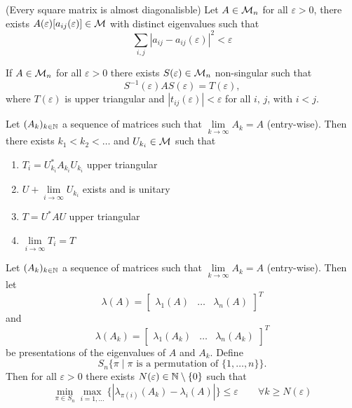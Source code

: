\documentclass[aspectratio=169]{beamer}
\begin{document}
\begin{frame}
\begin{theorem}(Every square matrix is almost diagonalisble)
Let $A\in \mathcal{M}_n$ for all $\varepsilon>0$, there exists $A(\varepsilon)[a_{ij}(\varepsilon)]\in \mathcal{M}$ with distinct eigenvalues such that 
\[\sum\limits_{i,j} | a_{ij}- a_{ij}(\varepsilon)|^2< \varepsilon\]
\end{theorem}
\vfill
\begin{theorem}
If $A\in \mathcal{M}_n$ for all $\varepsilon>0$ there exists $S(\varepsilon)\in \mathcal{M}_n$ non-singular such that 
\[S^{-1}(\varepsilon)AS(\varepsilon)=T(\varepsilon),\]
where $T(\varepsilon)$ is upper triangular and $| t_{ij}(\varepsilon)| <\varepsilon$ for all $i,\, j$, with $i<j$.
\end{theorem}
\end{frame}

\begin{frame}
\begin{lemma}
Let $(A_k)_{k\in \mathbb{N}}$ a sequence of matrices such that $\lim\limits_{k\to \infty}A_k=A$ (entry-wise). Then there exists $k_1< k_2 <\ldots $ and $U_{k_i}\in \mathcal{M}$ such that 
\begin{enumerate}
    \item $T_{i}= U_{k_i}^*A_{k_i} U_{k_i}$ upper triangular
    \item $U+\lim\limits_{i\to \infty} U_{k_i}$ exists and is unitary
    \item $T= U^* AU$ upper triangular
    \item $\lim\limits_{i\to \infty} T_i=T$    
\end{enumerate}
\end{lemma}
\end{frame}


\begin{frame}
\begin{theorem}
Let $(A_k)_{k\in \mathbb{N}}$ a sequence of matrices such that $\lim\limits_{k\to \infty}A_k=A$ (entry-wise). Then let 
\[\lambda(A)= \begin{bmatrix}
\lambda_1(A)& \ldots & \lambda_n(A)
\end{bmatrix}^T\] 
and 
\[\lambda(A_k)= \begin{bmatrix}
\lambda_1(A_k)& \ldots & \lambda_n(A_k)
\end{bmatrix}^T\]
be presentations of the eigenvalues of $A$ and $A_k$. Define 
\[S_n\{ \pi \mid \pi \mbox{ is a permutation of } \{1, \ldots, n\}\}.\]
Then for all $\varepsilon>0$ there exists $N(\varepsilon)\in \mathbb{N}\setminus \{0\}$ such that 
\[\min\limits_{\pi\in S_n} \max\limits_{i=1, \ldots} \{| \lambda_{\pi(i)}(A_k)-\lambda_i(A)| \}\leq \varepsilon \qquad \forall k \geq N(\varepsilon)\]
\end{theorem}
\end{frame}
\end{document}
